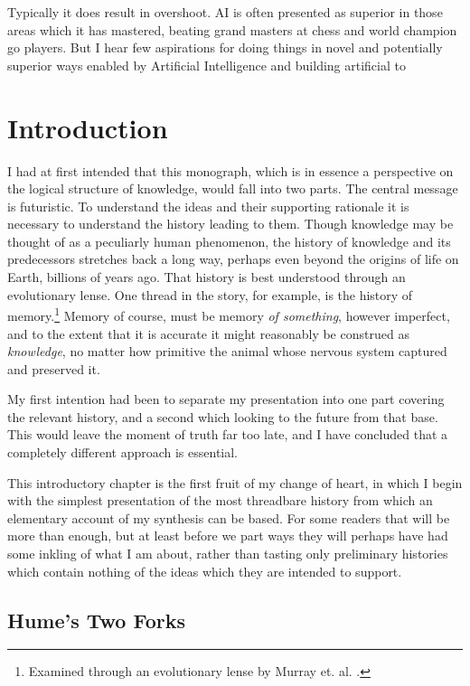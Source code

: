 \documentclass[10pt,titlepage]{book}
\begin{document}
Typically it does result in overshoot.
AI is often presented as superior in those areas which it has mastered, beating grand masters at chess and world champion go players.
But I hear few aspirations for doing things in novel and potentially superior ways enabled by Artificial Intelligence and building artificial to 

\chapter{Introduction}

I had at first intended that this monograph, which is in essence a perspective on the logical structure of knowledge, would fall into two parts.
The central message is futuristic.
To understand the ideas and their supporting rationale it is necessary to understand the history leading to them.
Though knowledge may be thought of as a peculiarly human phenomenon, the history of knowledge and its predecessors stretches back a long way, perhaps even beyond the origins of life on Earth, billions of years ago.
That history is best understood through an evolutionary lense.
One thread in the story, for example, is the history of memory.\footnote{Examined through an evolutionary lense by Murray et. al. \cite{murray2017evolution}.}
Memory of course, must be memory \emph{of something}, however imperfect, and to the extent that it is accurate it might reasonably be construed as \emph{knowledge}, no matter how primitive the animal whose nervous system captured and preserved it.

My first intention had been to separate my presentation into one part covering the relevant history, and a second which looking to the future from that base.
This would leave the moment of truth far too late, and I have concluded that a completely different approach is essential.

This introductory chapter is the first fruit of my change of heart, in which I begin with the simplest presentation of the most threadbare history from which an elementary account of my synthesis can be based.
For some readers that will be more than enough, but at least before we part ways they will perhaps have had some inkling of what I am about, rather than tasting only preliminary histories which contain nothing of the ideas which they are intended to support.

\section{Hume's Two Forks}
\end{document}
